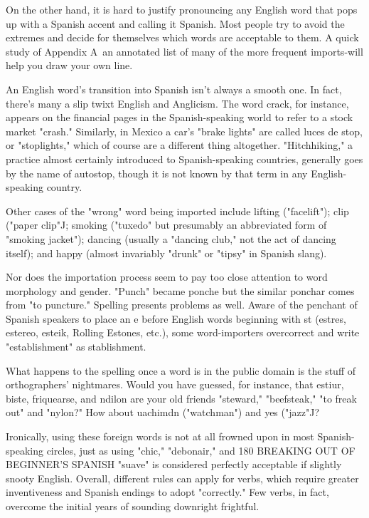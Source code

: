 \documentclass[14pt,a4paper,oneside]{memoir}
\begin{document}
{{{{On the other hand, it is hard to justify pronouncing any English word that pops up with a Spanish accent and calling it Spanish.
Most people try to avoid the extremes and decide for themselves which
words are acceptable to them. A quick study of Appendix A~an annotated list of many of the more frequent imports-will help you draw
your own line.

An English word's transition into Spanish isn't always a
smooth one. In fact, there's many a slip twixt English and Anglicism.
The word crack, for instance, appears on the financial pages in the
Spanish-speaking world to refer to a stock market "crash." Similarly,
in Mexico a car's "brake lights" are called luces de stop, or "stoplights," which of course are a different thing altogether. "Hitchhiking,"
a practice almost certainly introduced to Spanish-speaking countries,
generally goes by the name of autostop, though it is not known by that
term in any English-speaking country.

Other cases of the "wrong" word being imported include lifting ("facelift"); clip ("paper clip"J; smoking ("tuxedo" but presumably
an abbreviated form of "smoking jacket"); dancing (usually a "dancing club," not the act of dancing itself); and happy (almost invariably
"drunk" or "tipsy" in Spanish slang).

Nor does the importation process seem to pay too close attention to word morphology and gender. "Punch" became ponche but the
similar ponchar comes from "to puncture." Spelling presents problems
as well. Aware of the penchant of Spanish speakers to place an e before English words beginning with st (estres, estereo, esteik, Rolling
Estones, etc.), some word-importers overcorrect and write "establishment" as stablishment.

What happens to the spelling once a word is in the public
domain is the stuff of orthographers' nightmares. Would you have
guessed, for instance, that estiur, biste, friquearse, and ndilon are your
old friends "steward," "beefsteak," "to freak out" and "nylon?" How
about uachimdn ("watchman") and yes ("jazz"J?

Ironically, using these foreign words is not at all frowned upon
in most Spanish-speaking circles, just as using "chic," "debonair," and
180 BREAKING OUT OF BEGINNER'S SPANISH
"suave" is considered perfectly acceptable if slightly snooty English.
Overall, different rules can apply for verbs, which require greater inventiveness and Spanish endings to adopt "correctly." Few verbs, in
fact, overcome the initial years of sounding downright frightful.

}}}}
\end{document}
